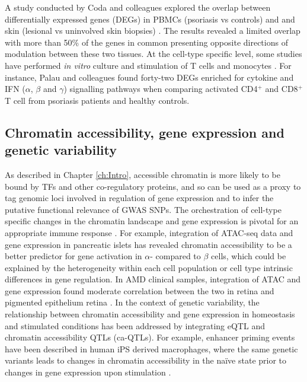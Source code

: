 A study conducted by Coda and colleagues explored the overlap between differentially expressed genes (DEGs) in PBMCs (psoriasis vs controls) and and skin (lesional vs uninvolved skin biopsies) \parencite{Coda2012}. The results revealed a limited overlap with more than 50\% of the genes in common presenting opposite directions of modulation between these two tissues. At the cell-type specific level, some studies have performed \textit{in vitro} culture and stimulation of T cells and monocytes \parencite{Palau2013, Jung2004}. For instance, Palau and colleagues found forty-two DEGs enriched for cytokine and IFN ($\alpha$, $\beta$ and $\gamma$) signalling pathways when comparing activated CD4$^+$ and CD8$^+$ T cell from psoriasis patients and healthy controls. %


\subsection{Chromatin accessibility, gene expression and genetic variability}
As described in Chapter \ref{ch:Intro}, accessible chromatin is more likely to be bound by TFs and other co-regulatory proteins, and so can be used as a proxy to tag genomic loci involved in regulation of gene expression and to infer the putative functional relevance of GWAS SNPs. The orchestration of cell-type specific changes in the chromatin landscape and gene expression is pivotal for an appropriate immune response \parencite{Goodnow2005}. For example, integration of ATAC-seq data and gene expression in pancreatic islets has revealed chromatin accessibility to be a better predictor for gene activation in $\alpha$- compared to $\beta$ cells, which could be explained by the heterogeneity within each cell population or cell type intrinsic differences in gene regulation. In AMD clinical samples, integration of ATAC and gene expression found moderate correlation between the two in retina and pigmented epithelium retina \parencite{Wang2018}. In the context of genetic variability, the relationship between chromatin accessibility and gene expression in homeostasis and stimulated conditions has been addressed by integrating eQTL and chromatin accessibility QTLs (ca-QTLs). For example, enhancer priming events have been described in human iPS derived macrophages, where the same genetic variants leads to changes in chromatin accessibility in the na\"{i}ve state prior to changes in gene expression upon stimulation \parencite{Alasoo2018}. 


